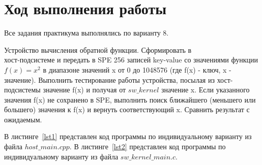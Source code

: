\section{Ход выполнения работы}

Все задания практикума выполнялись по варианту 8.

Устройство вычисления обратной функции. Сформировать в \\ хост-подсистеме и передать в SPE 256 записей key-value со значениями функции $f(x)=x^2$ в диапазоне значений x от 0 до 1048576 (где f(x) - ключ, x - значение). Выполнить тестирование работы устройства, посылая из хост-подсистемы значение f(x) и получая от $sw\_kernel$ значение x. Если указанного значения f(x) не сохранено в SPE, выполнить поиск ближайшего (меньшего или большего) значения к f(x) и вернуть соответствующий x. Сравнить результат с ожидаемым.


В листинге~\ref{lst1} представлен код программы по индивидуальному варианту из файла $host\_main.cpp$. В листинге~\ref{lst2} представлен код программы по индивидуальному варианту из файла $sw\_kernel\_main.c$.

